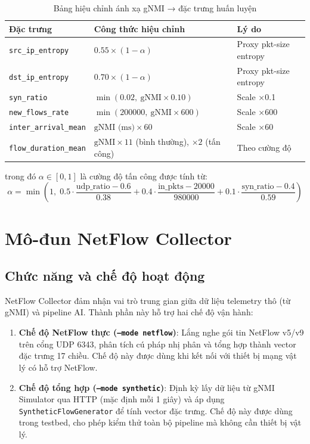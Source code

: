 \documentclass[12pt,a4paper]{article}
\begin{document}
\begin{table}[H]
\centering
\caption{Bảng hiệu chỉnh ánh xạ gNMI → đặc trưng huấn luyện}
\label{tab:calibration}
\begin{tabular}{p{4.5cm}p{5cm}p{4cm}}
\toprule
\textbf{Đặc trưng} & \textbf{Công thức hiệu chỉnh} & \textbf{Lý do} \\
\midrule
\texttt{src\_ip\_entropy}   & $0.55 \times (1 - \alpha)$ & Proxy pkt-size entropy \\
\texttt{dst\_ip\_entropy}   & $0.70 \times (1 - \alpha)$ & Proxy pkt-size entropy \\
\texttt{syn\_ratio}         & $\min(0.02,\ \text{gNMI} \times 0.10)$ & Scale ×0.1 \\
\texttt{new\_flows\_rate}   & $\min(200000,\ \text{gNMI} \times 600)$ & Scale ×600 \\
\texttt{inter\_arrival\_mean} & $\text{gNMI (ms)} \times 60$ & Scale ×60 \\
\texttt{flow\_duration\_mean} & $\text{gNMI} \times 11$ (bình thường), $\times 2$ (tấn công) & Theo cường độ \\
\bottomrule
\end{tabular}
\end{table}

\noindent trong đó $\alpha \in [0,1]$ là cường độ tấn công được tính từ:
\[
\alpha = \min\!\left(1,\; 0.5 \cdot \frac{\text{udp\_ratio} - 0.6}{0.38} + 0.4 \cdot \frac{\text{in\_pkts} - 20000}{980000} + 0.1 \cdot \frac{\text{syn\_ratio} - 0.4}{0.59}\right)
\]

\section{Mô-đun NetFlow Collector}

\subsection{Chức năng và chế độ hoạt động}

NetFlow Collector đảm nhận vai trò trung gian giữa dữ liệu telemetry thô (từ gNMI) và pipeline AI. Thành phần này hỗ trợ hai chế độ vận hành:

\begin{enumerate}[leftmargin=2em]
\item \textbf{Chế độ NetFlow thực (\texttt{--mode netflow})}: Lắng nghe gói tin NetFlow v5/v9 trên cổng UDP 6343, phân tích cú pháp nhị phân và tổng hợp thành vector đặc trưng 17 chiều. Chế độ này được dùng khi kết nối với thiết bị mạng vật lý có hỗ trợ NetFlow.

\item \textbf{Chế độ tổng hợp (\texttt{--mode synthetic})}: Định kỳ lấy dữ liệu từ gNMI Simulator qua HTTP (mặc định mỗi 1 giây) và áp dụng \texttt{SyntheticFlowGenerator} để tính vector đặc trưng. Chế độ này được dùng trong testbed, cho phép kiểm thử toàn bộ pipeline mà không cần thiết bị vật lý.
\end{enumerate}
\end{document}

